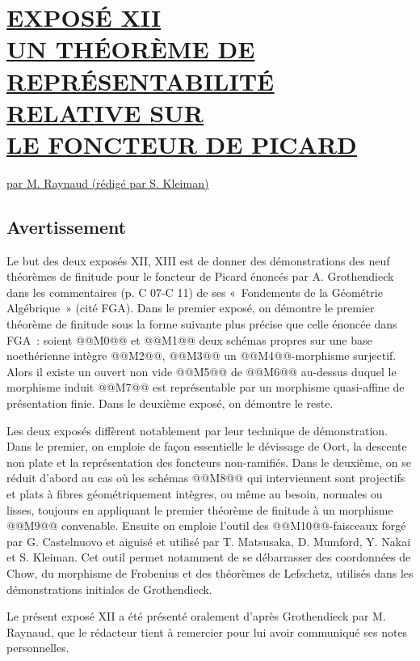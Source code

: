 
\section*{\underline{EXPOSÉ XII}\\[3pt] \underline{\underline{UN THÉORÈME DE REPRÉSENTABILITÉ RELATIVE SUR}}\\[3pt] \underline{\underline{LE FONCTEUR DE PICARD}}}
\begin{center}
\underline{par M. Raynaud (rédigé par S. Kleiman)}
\end{center}

\subsection*{Avertissement}

Le but des deux exposés XII, XIII est de donner des démonstrations des neuf théorèmes de finitude pour le foncteur de Picard énoncés par A. Grothendieck dans les commentaires (p. C 07-C 11) de ses «~Fondements de la Géométrie Algébrique~» (cité FGA). Dans le premier exposé, on démontre le premier théorème de finitude sous la forme suivante plus précise que celle énoncée dans FGA~: soient @@M0@@ et @@M1@@ deux schémas propres sur une base noethérienne intègre @@M2@@, @@M3@@ un @@M4@@-morphisme surjectif. Alors il existe un ouvert non vide @@M5@@ de @@M6@@ au-dessus duquel le morphisme induit @@M7@@ est représentable par un morphisme quasi-affine de présentation finie. Dans le deuxième exposé, on démontre le reste.

Les deux exposés diffèrent notablement par leur technique de démonstration. Dans le premier, on emploie de façon essentielle le dévissage de Oort, la descente non plate et la représentation des foncteurs non-ramifiés. Dans le deuxième, on se réduit d'abord au cas où les schémas @@M8@@ qui interviennent sont projectifs et plats à fibres géométriquement intègres, ou même au besoin, normales ou lisses, toujours en appliquant le premier théorème de finitude à un morphisme @@M9@@ convenable. Ensuite on emploie l'outil des @@M10@@-faisceaux forgé par G. Castelnuovo et aiguisé et utilisé par T. Matsusaka, D. Mumford, Y. Nakai et S. Kleiman. Cet outil permet notamment de se débarrasser des coordonnées de Chow, du morphisme de Frobenius et des théorèmes de Lefschetz, utilisés dans les démonstrations initiales de Grothendieck.

Le présent exposé XII a été présenté oralement d'après Grothendieck par M. Raynaud, que le rédacteur tient à remercier pour lui avoir communiqué ses notes personnelles.

